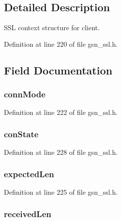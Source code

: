 \subsection{Detailed Description}
SSL context structure for client. 

Definition at line 220 of file gsn\_\-ssl.h.



\subsection{Field Documentation}
\hypertarget{a00243_aeff852947f5fd4b9b609d3ef04ebe22a}{
\subsubsection[{connMode}]{ {\bf connMode}}}
\label{a00243_aeff852947f5fd4b9b609d3ef04ebe22a}


Definition at line 222 of file gsn\_\-ssl.h.

\hypertarget{a00243_acb69cb3fa328edc1fb385aa446668bdd}{
\subsubsection[{conState}]{ {\bf conState}}}
\label{a00243_acb69cb3fa328edc1fb385aa446668bdd}


Definition at line 228 of file gsn\_\-ssl.h.

\hypertarget{a00243_a1a40ca49a468072350c826dc4132855a}{
\subsubsection[{expectedLen}]{ {\bf expectedLen}}}
\label{a00243_a1a40ca49a468072350c826dc4132855a}


Definition at line 225 of file gsn\_\-ssl.h.

\hypertarget{a00243_a8ad381330a4d477907ef368e97af5780}{
\subsubsection[{receivedLen}]{ {\bf receivedLen}}}
\label{a00243_a8ad381330a4d477907ef368e97af5780}


